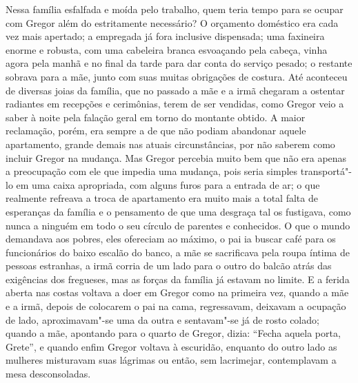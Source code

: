 Nessa família esfalfada e moída pelo trabalho, quem teria tempo para se
ocupar com Gregor além do estritamente necessário? O orçamento doméstico
era cada vez mais apertado; a empregada já fora inclusive dispensada; uma
faxineira enorme e robusta, com uma cabeleira branca esvoaçando pela
cabeça, vinha agora pela manhã e no final da tarde para dar conta do
serviço pesado; o restante sobrava para a mãe, junto com suas muitas
obrigações de costura. Até aconteceu de diversas joias da família, que no
passado a mãe e a irmã chegaram a ostentar radiantes em recepções e
cerimônias, terem de ser vendidas, como Gregor veio a saber à noite pela
falação geral em torno do montante obtido. A maior reclamação, porém, era
sempre a de que não podiam abandonar aquele apartamento, grande demais nas
atuais circunstâncias, por não saberem como incluir Gregor na mudança. Mas
Gregor percebia muito bem que não era apenas a preocupação com ele que
impedia uma mudança, pois seria simples transportá"-lo em uma caixa
apropriada, com alguns furos para a entrada de ar; o que realmente
refreava a troca de apartamento era muito mais a total falta de esperanças
da família e o pensamento de que uma desgraça tal os fustigava, como nunca
a ninguém em todo o seu círculo de parentes e conhecidos. O que o mundo
demandava aos
pobres, eles ofereciam ao máximo,
o pai ia buscar café para
os funcionários do baixo escalão do banco, a mãe se sacrificava pela roupa
íntima de pessoas estranhas, a irmã corria de um lado para o outro do
balcão atrás das exigências dos fregueses, mas as forças da família já
estavam no limite. E a ferida aberta nas costas voltava a doer em Gregor
como na primeira vez, quando a mãe e a irmã, depois de colocarem o pai na
cama, regressavam, deixavam a ocupação de lado, aproximavam"-se uma da
outra e sentavam"-se já de rosto colado; quando a mãe, apontando para
o quarto de Gregor, dizia: “Fecha aquela porta, Grete”, e quando enfim
Gregor voltava à escuridão, enquanto do outro lado as mulheres misturavam
suas lágrimas ou então, sem lacrimejar, contemplavam a mesa desconsoladas.

